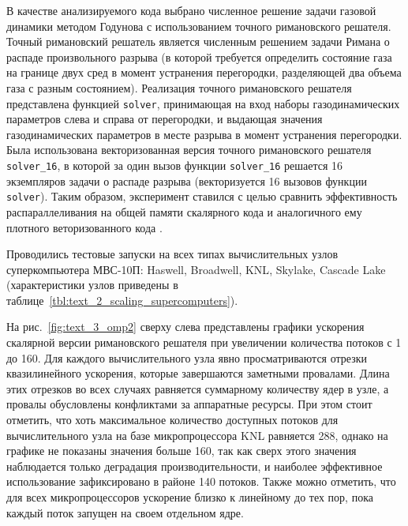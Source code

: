 В качестве анализируемого кода выбрано численное решение задачи газовой динамики методом Годунова с использованием точного римановского решателя.
Точный римановский решатель является численным решением задачи Римана о распаде произвольного разрыва (в которой требуется определить состояние газа на границе двух сред в момент устранения перегородки, разделяющей два объема газа с разным состоянием).
Реализация точного римановского решателя \cite{riemannvecGithub} представлена функцией \texttt{solver}, принимающая на вход наборы газодинамических параметров слева и справа от перегородки, и выдающая значения газодинамических параметров в месте разрыва в момент устранения перегородки.
Была использована векторизованная версия точного римановского решателя \texttt{solver\_16}, в которой за один вызов функции \texttt{solver\_16} решается 16 экземпляров задачи о распаде разрыва (векторизуется 16 вызовов функции \texttt{solver}).
Таким образом, эксперимент ставился с целью сравнить эффективность распараллеливания на общей памяти скалярного кода и аналогичного ему плотного веторизованного кода \cite{Vorobyov2020ParVec,Vorobyov2020Scaling}.

Проводились тестовые запуски на всех типах вычислительных узлов суперкомпьютера МВС-10П: Haswell, Broadwell, KNL\label{abbr:knl-4}, Skylake, Cascade Lake (характеристики узлов приведены в таблице~\ref{tbl:text_2_scaling_supercomputers}).

На рис.~\ref{fig:text_3_omp2} сверху слева представлены графики ускорения скалярной версии римановского решателя при увеличении количества потоков с 1 до 160.
Для каждого вычислительного узла явно просматриваются отрезки квазилинейного ускорения, которые завершаются заметными провалами.
Длина этих отрезков во всех случаях равняется суммарному количеству ядер в узле, а провалы обусловлены конфликтами за аппаратные ресурсы.
При этом стоит отметить, что хоть максимальное количество доступных потоков для вычислительного узла на базе микропроцессора KNL равняется 288, однако на графике не показаны значения больше 160, так как сверх этого значения наблюдается только деградация производительности, и наиболее эффективное использование зафиксировано в районе 140 потоков.
Также можно отметить, что для всех микропроцессоров ускорение близко к линейному до тех пор, пока каждый поток запущен на своем отдельном ядре.

